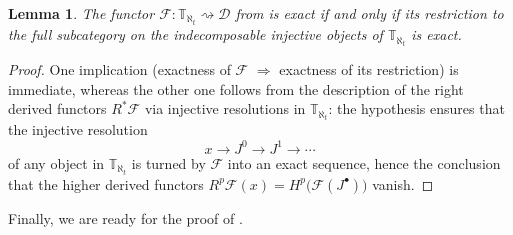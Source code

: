\documentclass[11pt]{article}
\theoremstyle{plain}
\newtheorem{lemma}{Lemma}[section]
\theoremstyle{nonumberplain}
\theoremstyle{plain}
\theoremstyle{nonumberplain}
\newtheorem{proof}{Proof}
\newcommand\bT{\mathbb T}
\newcommand\cD{\mathcal D}
\begin{document}
\begin{lemma}\label{le.univ}
  The functor $\mathcal{F}:\bT_{\aleph_t}\rightsquigarrow \cD$ from  is exact
  if and only if its restriction to the full subcategory on the
  indecomposable injective objects  of $\bT_{\aleph_t}$
  is exact.
\end{lemma}
\begin{proof}
  One implication (exactness of $\mathcal{F}$ $\Rightarrow$ exactness of its
  restriction) is immediate, whereas the other one follows from the
  description of the right derived functors $R^*\mathcal{F}$ via injective
  resolutions in $\bT_{\aleph_t}$: the hypothesis ensures that the
  injective resolution
  \begin{equation*}
    x\to J^0\to J^1\to\cdots
  \end{equation*}
  of any object in $\bT_{\aleph_t}$ is turned by $\mathcal{F}$ into an exact
  sequence, hence the conclusion that the higher derived functors
  $R^p\mathcal{F}(x)=H^p\big(\mathcal{F}(J^\bullet)\big)$ vanish.
\end{proof}













Finally, we are ready for the proof of .
\end{document}
